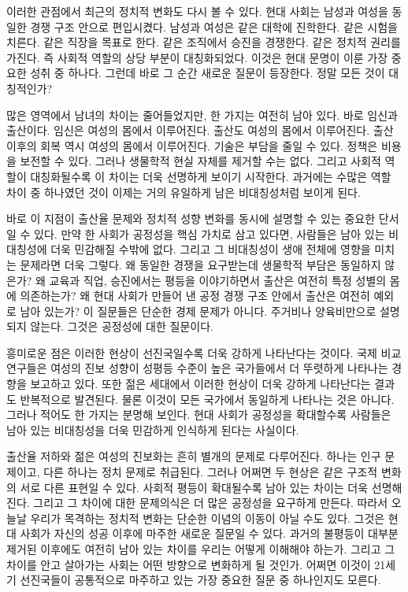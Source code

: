 \documentclass[12pt]{article}
\begin{document}
이러한 관점에서 최근의 정치적 변화도 다시 볼 수 있다. 현대 사회는 남성과 여성을 동일한 경쟁 구조 안으로 편입시켰다. 남성과 여성은 같은 대학에 진학한다. 같은 시험을 치른다. 같은 직장을 목표로 한다. 같은 조직에서 승진을 경쟁한다. 같은 정치적 권리를 가진다. 즉 사회적 역할의 상당 부분이 대칭화되었다. 이것은 현대 문명이 이룬 가장 중요한 성취 중 하나다. 그런데 바로 그 순간 새로운 질문이 등장한다. 정말 모든 것이 대칭적인가?

많은 영역에서 남녀의 차이는 줄어들었지만, 한 가지는 여전히 남아 있다. 바로 임신과 출산이다. 임신은 여성의 몸에서 이루어진다. 출산도 여성의 몸에서 이루어진다. 출산 이후의 회복 역시 여성의 몸에서 이루어진다. 기술은 부담을 줄일 수 있다. 정책은 비용을 보전할 수 있다. 그러나 생물학적 현실 자체를 제거할 수는 없다. 그리고 사회적 역할이 대칭화될수록 이 차이는 더욱 선명하게 보이기 시작한다. 과거에는 수많은 역할 차이 중 하나였던 것이 이제는 거의 유일하게 남은 비대칭성처럼 보이게 된다.

바로 이 지점이 출산율 문제와 정치적 성향 변화를 동시에 설명할 수 있는 중요한 단서일 수 있다. 만약 한 사회가 공정성을 핵심 가치로 삼고 있다면, 사람들은 남아 있는 비대칭성에 더욱 민감해질 수밖에 없다. 그리고 그 비대칭성이 생애 전체에 영향을 미치는 문제라면 더욱 그렇다. 왜 동일한 경쟁을 요구받는데 생물학적 부담은 동일하지 않은가? 왜 교육과 직업, 승진에서는 평등을 이야기하면서 출산은 여전히 특정 성별의 몸에 의존하는가? 왜 현대 사회가 만들어 낸 공정 경쟁 구조 안에서 출산은 여전히 예외로 남아 있는가?
이 질문들은 단순한 경제 문제가 아니다. 주거비나 양육비만으로 설명되지 않는다. 그것은 공정성에 대한 질문이다.

흥미로운 점은 이러한 현상이 선진국일수록 더욱 강하게 나타난다는 것이다. 국제 비교 연구들은 여성의 진보 성향이 성평등 수준이 높은 국가들에서 더 뚜렷하게 나타나는 경향을 보고하고 있다. 또한 젊은 세대에서 이러한 현상이 더욱 강하게 나타난다는 결과도 반복적으로 발견된다. 물론 이것이 모든 국가에서 동일하게 나타나는 것은 아니다. 그러나 적어도 한 가지는 분명해 보인다. 현대 사회가 공정성을 확대할수록 사람들은 남아 있는 비대칭성을 더욱 민감하게 인식하게 된다는 사실이다.

출산율 저하와 젊은 여성의 진보화는 흔히 별개의 문제로 다루어진다. 하나는 인구 문제이고, 다른 하나는 정치 문제로 취급된다. 그러나 어쩌면 두 현상은 같은 구조적 변화의 서로 다른 표현일 수 있다. 사회적 평등이 확대될수록 남아 있는 차이는 더욱 선명해진다. 그리고 그 차이에 대한 문제의식은 더 많은 공정성을 요구하게 만든다. 따라서 오늘날 우리가 목격하는 정치적 변화는 단순한 이념의 이동이 아닐 수도 있다. 그것은 현대 사회가 자신의 성공 이후에 마주한 새로운 질문일 수 있다. 과거의 불평등이 대부분 제거된 이후에도 여전히 남아 있는 차이를 우리는 어떻게 이해해야 하는가. 그리고 그 차이를 안고 살아가는 사회는 어떤 방향으로 변화하게 될 것인가. 어쩌면 이것이 21세기 선진국들이 공통적으로 마주하고 있는 가장 중요한 질문 중 하나인지도 모른다.
\end{document}
